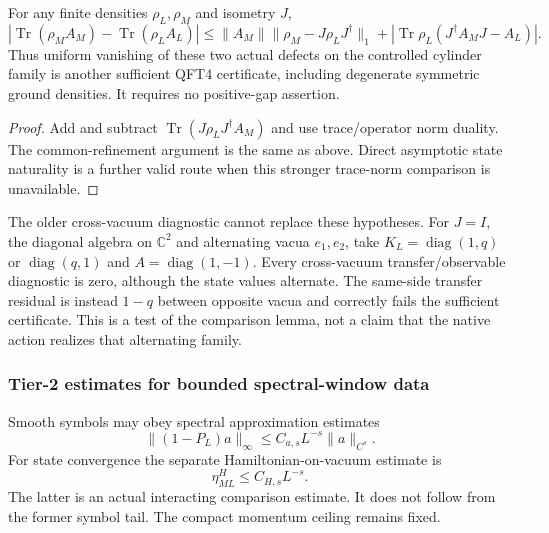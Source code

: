 \documentclass[12pt,a4paper]{article}
\begin{document}
\begin{proposition}
\label{p12:prop:v2211-mixed-state-refinement-bound}
For any finite densities $\rho_L,\rho_M$ and isometry $J$,
\[
 |\operatorname{Tr}(\rho_M A_M)-\operatorname{Tr}(\rho_L A_L)|
 \le\|A_M\|\|\rho_M-J\rho_LJ^\dagger\|_1
 +|\operatorname{Tr}\rho_L(J^\dagger A_MJ-A_L)|.
\]
Thus uniform vanishing of these two actual defects on the controlled cylinder
family is another sufficient QFT4 certificate, including degenerate symmetric
ground densities. It requires no positive-gap assertion.
\end{proposition}
\begin{proof}
Add and subtract $\operatorname{Tr}(J\rho_LJ^\dagger A_M)$ and use
trace/operator norm duality. The common-refinement argument is the same as
above. Direct asymptotic state naturality is a further valid route when this
stronger trace-norm comparison is unavailable.
\end{proof}

The older cross-vacuum diagnostic cannot replace these hypotheses. For
$J=I$, the diagonal algebra on $\mathbb C^2$ and alternating vacua $e_1,e_2$,
take $K_L=\operatorname{diag}(1,q)$ or $\operatorname{diag}(q,1)$ and
$A=\operatorname{diag}(1,-1)$. Every cross-vacuum transfer/observable
diagnostic is zero, although the state values alternate. The same-side
transfer residual is instead $1-q$ between opposite vacua and correctly
fails the sufficient certificate. This is a test of the comparison lemma,
not a claim that the native action realizes that alternating family.


\subsubsection{Tier-2 estimates for bounded spectral-window data}
\label{p12:subsec:tier2-spectral-window-estimates}

\begin{definition}
\label{p12:def:tier2-spectral-window-class}
Smooth symbols may obey spectral approximation estimates
\begin{equation}
\label{p12:eq:spectral-tail-bound}
 \|(1-P_L)a\|_\infty\le C_{a,s}L^{-s}\|a\|_{C^s}.
\end{equation}
For state convergence the separate Hamiltonian-on-vacuum estimate is
\begin{equation}
\label{p12:eq:hamiltonian-tail-bound}
 \eta^H_{ML}\le C_{H,s}L^{-s}.
\end{equation}
The latter is an actual interacting comparison estimate. It does not follow
from the former symbol tail. The compact momentum ceiling remains fixed.
\end{definition}
\end{document}
